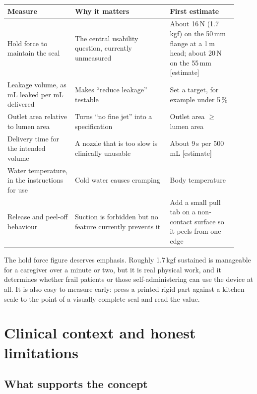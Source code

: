 \documentclass[11pt]{article}
\newcommand{\est}{\mbox{\textcolor{warn}{\footnotesize[estimate]}}}
\begin{document}
\vspace{0.4em}
\begin{center}
\small
\begin{tabular}{@{}p{0.27\linewidth}p{0.38\linewidth}p{0.27\linewidth}@{}}
\toprule
\textbf{Measure} & \textbf{Why it matters} & \textbf{First estimate} \\
\midrule
Hold force to maintain the seal & The central usability question, currently unmeasured & About 16\,N (1.7\,kgf) on the 50\,mm flange at a 1\,m head; about 20\,N on the 55\,mm \est \\
\addlinespace
Leakage volume, as mL leaked per mL delivered & Makes ``reduce leakage'' testable & Set a target, for example under 5\,\% \\
\addlinespace
Outlet area relative to lumen area & Turns ``no fine jet'' into a specification & Outlet area $\geq$ lumen area \\
\addlinespace
Delivery time for the intended volume & A nozzle that is too slow is clinically unusable & About 9\,s per 500\,mL \est \\
\addlinespace
Water temperature, in the instructions for use & Cold water causes cramping & Body temperature \\
\addlinespace
Release and peel-off behaviour & Suction is forbidden but no feature currently prevents it & Add a small pull tab on a non-contact surface so it peels from one edge \\
\bottomrule
\end{tabular}
\end{center}
\vspace{0.6em}

\noindent The hold force figure deserves emphasis. Roughly 1.7\,kgf sustained is manageable for a caregiver over a minute or two, but it is real physical work, and it determines whether frail patients or those self-administering can use the device at all. It is also easy to measure early: press a printed rigid part against a kitchen scale to the point of a visually complete seal and read the value.

\section{Clinical context and honest limitations}

\subsection*{What supports the concept}
\end{document}
